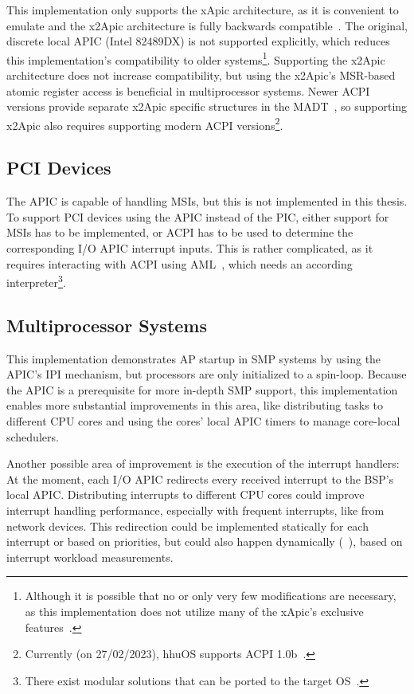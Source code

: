 This implementation only supports the xApic architecture, as it is convenient to emulate and the x2Apic architecture is fully backwards compatible~\autocite[sec.~3.11.12]{ia32}.
The original, discrete local APIC (Intel 82489DX) is not supported explicitly, which reduces this implementation's compatibility to older systems\footnote{
  Although it is possible that no or only very few modifications are necessary, as this implementation does not utilize many of the xApic's exclusive features~\autocite[sec.~3.23.27]{ia32}.}.
Supporting the x2Apic architecture does not increase compatibility, but using the x2Apic's MSR-based atomic register access is beneficial in multiprocessor systems.
Newer ACPI versions provide separate x2Apic specific structures in the MADT~\autocite[sec.~5.2.12.12]{acpi65}, so supporting x2Apic also requires supporting modern ACPI versions\footnote{
  Currently (on 27/02/2023), hhuOS supports ACPI 1.0b~\autocite{acpi1}.}.

\subsection{PCI Devices}
\label{subsec:pcidevices}

The APIC is capable of handling MSIs, but this is not implemented in this thesis.
To support PCI devices using the APIC instead of the PIC, either support for MSIs has to be implemented, or ACPI has to be used to determine the corresponding I/O APIC interrupt inputs.
This is rather complicated, as it requires interacting with ACPI using AML~\autocite[sec.~6.2.13]{acpi65}, which needs an according interpreter\footnote{
  There exist modular solutions that can be ported to the target OS~\autocite{acpica}.}.

\subsection{Multiprocessor Systems}
\label{subsec:multiprocessor}

This implementation demonstrates AP startup in SMP systems by using the APIC's IPI mechanism, but processors are only initialized to a spin-loop.
Because the APIC is a prerequisite for more in-depth SMP support, this implementation enables more substantial improvements in this area, like distributing tasks to different CPU cores and using the cores' local APIC timers to manage core-local schedulers.

Another possible area of improvement is the execution of the interrupt handlers: At the moment, each I/O APIC redirects every received interrupt to the BSP's local APIC\@.
Distributing interrupts to different CPU cores could improve interrupt handling performance, especially with frequent interrupts, like from network devices.
This redirection could be implemented statically for each interrupt or based on priorities, but could also happen dynamically (~\autocite{irqbalance}), based on interrupt workload measurements.

